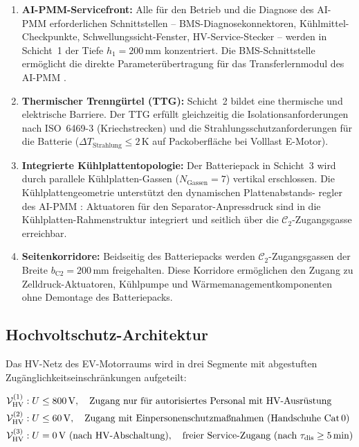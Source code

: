 ﻿\documentclass[12pt,a4paper]{article}
\begin{document}
\begin{enumerate}[leftmargin=*, label=(E\arabic*)]
	\item \textbf{AI-PMM-Servicefront:} Alle für den Betrieb und die Diagnose des
	AI-PMM erforderlichen Schnittstellen -- BMS-Diagnosekonnektoren, Kühlmittel-
	Checkpunkte, Schwellungssicht-Fenster, HV-Service-Stecker -- werden in
	Schicht~1 der Tiefe $h_1 = 200\,\mathrm{mm}$ konzentriert. Die BMS-Schnittstelle
	ermöglicht die direkte Parameterübertragung für das Transferlernmodul des
	AI-PMM \cite{Epp2026liion}.

	\item \textbf{Thermischer Trenngürtel (TTG):} Schicht~2 bildet eine thermische
	und elektrische Barriere. Der TTG erfüllt gleichzeitig die Isolationsanforderungen
	nach ISO~6469-3 (Kriechstrecken) und die Strahlungsschutzanforderungen für
	die Batterie ($\Delta T_\mathrm{Strahlung} \leq 2\,\mathrm{K}$ auf Packoberfläche
	bei Volllast E-Motor).

	\item \textbf{Integrierte Kühlplattentopologie:} Der Batteriepack in Schicht~3
	wird durch parallele Kühlplatten-Gassen ($N_\mathrm{Gassen} = 7$) vertikal
	erschlossen. Die Kühlplattengeometrie unterstützt den dynamischen Plattenabstands-
	regler des AI-PMM \cite{Epp2026liion}: Aktuatoren für den Separator-Anpressdruck
	sind in die Kühlplatten-Rahmenstruktur integriert und seitlich über die
	$\mathcal{C}_2$-Zugangsgasse erreichbar.

	\item \textbf{Seitenkorridore:} Beidseitig des Batteriepacks werden
	$\mathcal{C}_2$-Zugangsgassen der Breite $b_\mathrm{C2} = 200\,\mathrm{mm}$
	freigehalten. Diese Korridore ermöglichen den Zugang zu Zelldruck-Aktuatoren,
	Kühlpumpe und Wärmemanagementkomponenten ohne Demontage des Batteriepacks.
\end{enumerate}

\subsection{Hochvoltschutz-Architektur}

Das HV-Netz des EV-Motorraums wird in drei Segmente mit abgestuften
Zugänglichkeitseinschränkungen aufgeteilt:

\begin{align}
	\mathcal{V}_\mathrm{HV}^{(1)} &: U \leq 800\,\mathrm{V}, \quad
	\text{Zugang nur für autorisiertes Personal mit HV-Ausrüstung}
	\label{eq:hv_seg1} \\
	\mathcal{V}_\mathrm{HV}^{(2)} &: U \leq 60\,\mathrm{V}, \quad
	\text{Zugang mit Einpersonenschutzmaßnahmen (Handschuhe Cat\,0)}
	\label{eq:hv_seg2} \\
	\mathcal{V}_\mathrm{HV}^{(3)} &: U = 0\,\mathrm{V} \text{ (nach HV-Abschaltung)}, \quad
	\text{freier Service-Zugang (nach $\tau_\mathrm{dis} \geq 5\,\mathrm{min}$)}
	\label{eq:hv_seg3}
\end{align}
\end{document}

